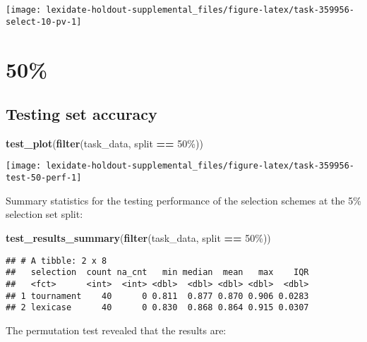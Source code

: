 \documentclass[
]{book}
\newenvironment{Shaded}{\begin{snugshade}}{\end{snugshade}}
\newcommand{\FunctionTok}[1]{\textcolor[rgb]{0.13,0.29,0.53}{\textbf{#1}}}
\newcommand{\NormalTok}[1]{#1}
\newcommand{\SpecialCharTok}[1]{\textcolor[rgb]{0.81,0.36,0.00}{\textbf{#1}}}
\newcommand{\StringTok}[1]{\textcolor[rgb]{0.31,0.60,0.02}{#1}}
\begin{document}
\texttt{[image: lexidate-holdout-supplemental\_files/figure-latex/task-359956-select-10-pv-1]}

\hypertarget{section-27}{%
\section{50\%}\label{section-27}}

\hypertarget{testing-set-accuracy-27}{%
\subsection{Testing set accuracy}\label{testing-set-accuracy-27}}

\begin{Shaded}
\begin{Highlighting}[]
\FunctionTok{test\_plot}\NormalTok{(}\FunctionTok{filter}\NormalTok{(task\_data, split }\SpecialCharTok{==} \StringTok{\textquotesingle{}50\%\textquotesingle{}}\NormalTok{))}
\end{Highlighting}
\end{Shaded}

\texttt{[image: lexidate-holdout-supplemental\_files/figure-latex/task-359956-test-50-perf-1]}

Summary statistics for the testing performance of the selection schemes at the 5\% selection set split:

\begin{Shaded}
\begin{Highlighting}[]
\FunctionTok{test\_results\_summary}\NormalTok{(}\FunctionTok{filter}\NormalTok{(task\_data, split }\SpecialCharTok{==} \StringTok{\textquotesingle{}50\%\textquotesingle{}}\NormalTok{))}
\end{Highlighting}
\end{Shaded}

\begin{verbatim}
## # A tibble: 2 x 8
##   selection  count na_cnt   min median  mean   max    IQR
##   <fct>      <int>  <int> <dbl>  <dbl> <dbl> <dbl>  <dbl>
## 1 tournament    40      0 0.811  0.877 0.870 0.906 0.0283
## 2 lexicase      40      0 0.830  0.868 0.864 0.915 0.0307
\end{verbatim}

The permutation test revealed that the results are:
\end{document}
